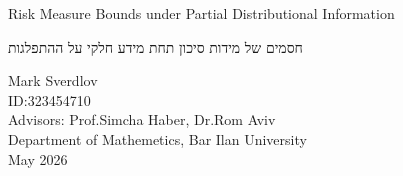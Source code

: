 \begin{titlepage}
    \begin{center}
        \vspace*{1cm}

        \Large{Risk Measure Bounds under Partial Distributional Information}

        \Large{\texthebrew{חסמים של מידות סיכון תחת מידע חלקי על ההתפלגות}}

        Mark Sverdlov \\
        ID:\@ 323454710
        \vspace{0.8cm} \\
        Advisors: Prof.\@ Simcha Haber, Dr.\@ Rom Aviv
        \vspace{0.8cm} \\
        Department of Mathemetics, Bar Ilan University \\
        May 2026
    \end{center}
\end{titlepage}
